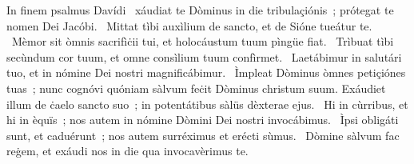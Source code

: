 { In finem psalmus Davídi}
{%
~xáudiat te Dòminus in die tribulaçiónis~; prótegat te nomen Dei Jacóbi. 
~Mittat tìbi auxìlium de sancto, et de Sióne tueátur te. 
~Mèmor sit òmnis sacrifìċii tui, et holocáustum tuum pìngüe fiat. 
~Trìbuat tìbi secùndum cor tuum, et omne consìlium tuum confìrmet. 
~Laetábimur in salutári tuo, et in nómine Dei nostri magnificábimur. 
~Ìmpleat Dòminus òmnes petiçiónes tuas~; nunc cognóvi quóniam sàlvum feċit Dòminus christum suum. Exáudiet illum de ċaelo sancto suo~; in potentátibus sàlüs dèxterae ejus. 
~Hi in cùrribus, et hi in èquïs~; nos autem in nómine Dòmini Dei nostri invocábimus. 
~Ìpsi obligáti sunt, et caduérunt~; nos autem surréximus et erécti sùmus. 
~Dòmine sàlvum fac reġem, et exáudi nos in die qua invocavèrimus te. 
}

